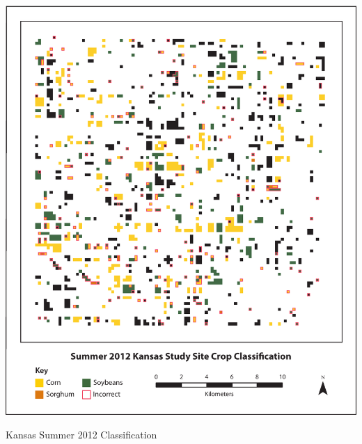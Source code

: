 \begin{ssfigure}
  \centering
  \includegraphics[width=\textwidth]{Graphics/KSclass.pdf}
  \caption{Kansas Summer 2012 Classification}
  \label{map:KSclassification}
\end{ssfigure}

